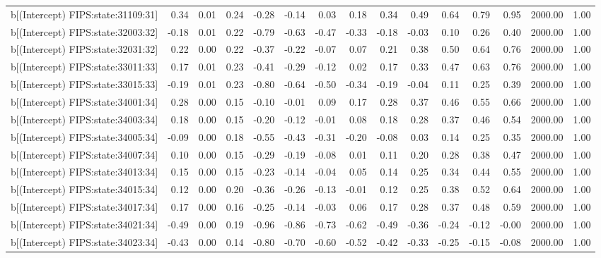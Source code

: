 \begin{table}[ht]
\begin{tabular}{rrrrrrrrrrrrrrr}
  b[(Intercept) FIPS:state:31109:31] & 0.34 & 0.01 & 0.24 & -0.28 & -0.14 & 0.03 & 0.18 & 0.34 & 0.49 & 0.64 & 0.79 & 0.95 & 2000.00 & 1.00 \\ 
  b[(Intercept) FIPS:state:32003:32] & -0.18 & 0.01 & 0.22 & -0.79 & -0.63 & -0.47 & -0.33 & -0.18 & -0.03 & 0.10 & 0.26 & 0.40 & 2000.00 & 1.00 \\ 
  b[(Intercept) FIPS:state:32031:32] & 0.22 & 0.00 & 0.22 & -0.37 & -0.22 & -0.07 & 0.07 & 0.21 & 0.38 & 0.50 & 0.64 & 0.76 & 2000.00 & 1.00 \\ 
  b[(Intercept) FIPS:state:33011:33] & 0.17 & 0.01 & 0.23 & -0.41 & -0.29 & -0.12 & 0.02 & 0.17 & 0.33 & 0.47 & 0.63 & 0.76 & 2000.00 & 1.00 \\ 
  b[(Intercept) FIPS:state:33015:33] & -0.19 & 0.01 & 0.23 & -0.80 & -0.64 & -0.50 & -0.34 & -0.19 & -0.04 & 0.11 & 0.25 & 0.39 & 2000.00 & 1.00 \\ 
  b[(Intercept) FIPS:state:34001:34] & 0.28 & 0.00 & 0.15 & -0.10 & -0.01 & 0.09 & 0.17 & 0.28 & 0.37 & 0.46 & 0.55 & 0.66 & 2000.00 & 1.00 \\ 
  b[(Intercept) FIPS:state:34003:34] & 0.18 & 0.00 & 0.15 & -0.20 & -0.12 & -0.01 & 0.08 & 0.18 & 0.28 & 0.37 & 0.46 & 0.54 & 2000.00 & 1.00 \\ 
  b[(Intercept) FIPS:state:34005:34] & -0.09 & 0.00 & 0.18 & -0.55 & -0.43 & -0.31 & -0.20 & -0.08 & 0.03 & 0.14 & 0.25 & 0.35 & 2000.00 & 1.00 \\ 
  b[(Intercept) FIPS:state:34007:34] & 0.10 & 0.00 & 0.15 & -0.29 & -0.19 & -0.08 & 0.01 & 0.11 & 0.20 & 0.28 & 0.38 & 0.47 & 2000.00 & 1.00 \\ 
  b[(Intercept) FIPS:state:34013:34] & 0.15 & 0.00 & 0.15 & -0.23 & -0.14 & -0.04 & 0.05 & 0.14 & 0.25 & 0.34 & 0.44 & 0.55 & 2000.00 & 1.00 \\ 
  b[(Intercept) FIPS:state:34015:34] & 0.12 & 0.00 & 0.20 & -0.36 & -0.26 & -0.13 & -0.01 & 0.12 & 0.25 & 0.38 & 0.52 & 0.64 & 2000.00 & 1.00 \\ 
  b[(Intercept) FIPS:state:34017:34] & 0.17 & 0.00 & 0.16 & -0.25 & -0.14 & -0.03 & 0.06 & 0.17 & 0.28 & 0.37 & 0.48 & 0.59 & 2000.00 & 1.00 \\ 
  b[(Intercept) FIPS:state:34021:34] & -0.49 & 0.00 & 0.19 & -0.96 & -0.86 & -0.73 & -0.62 & -0.49 & -0.36 & -0.24 & -0.12 & -0.00 & 2000.00 & 1.00 \\ 
  b[(Intercept) FIPS:state:34023:34] & -0.43 & 0.00 & 0.14 & -0.80 & -0.70 & -0.60 & -0.52 & -0.42 & -0.33 & -0.25 & -0.15 & -0.08 & 2000.00 & 1.00 \\ 

\end{tabular}
\end{table}
